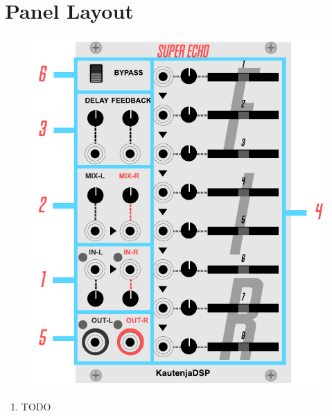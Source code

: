 \documentclass[12pt,letter]{article}
\begin{document}

\clearpage
\section{Panel Layout}

\begin{figure}[!htp]
\centering
\includegraphics{img/Interface}
\end{figure}

\clearpage
\begin{enumerate}
  \item TODO
\end{enumerate}
\end{document}
